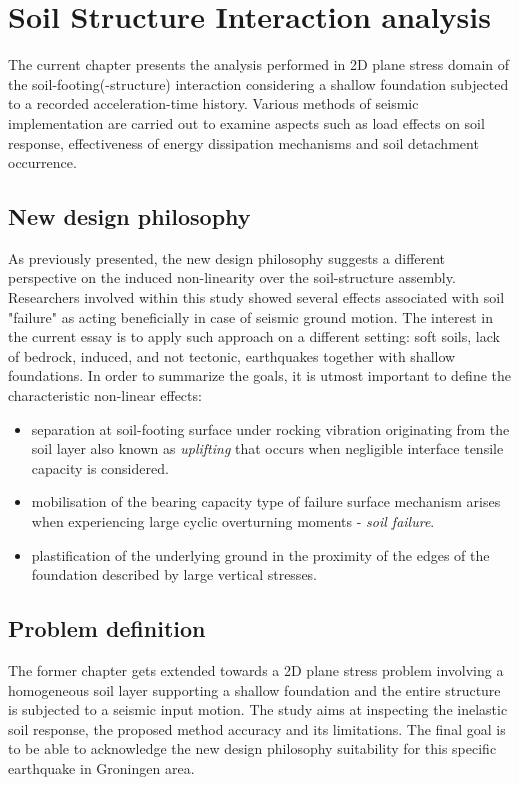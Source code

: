 	\chapter{Soil Structure Interaction analysis} \label{ch6}
	
	The current chapter presents the analysis performed in 2D plane stress domain of the soil-footing(-structure) interaction considering a shallow foundation subjected to a recorded acceleration-time history. Various methods of seismic implementation are carried out to examine aspects such as load effects on soil response, effectiveness of energy dissipation mechanisms and soil detachment occurrence.
	
	\section{New design philosophy}
	As previously presented, the new design philosophy suggests a different perspective on the induced non-linearity over the soil-structure assembly. Researchers involved within this study showed \mbox{several} effects associated with soil "failure" as acting beneficially in case of seismic ground motion. The interest in the current essay is to apply such approach on a different setting: soft soils, lack of bedrock, induced, and not tectonic, earthquakes together with shallow foundations. In order to summarize the goals, it is utmost important to define the characteristic non-linear effects:
	\begin{itemize}
		\item separation at soil-footing surface under rocking vibration originating from the soil layer also known as \textit{uplifting} that occurs when negligible interface tensile capacity is considered.
		\item mobilisation of the bearing capacity type of failure surface mechanism arises when experiencing large cyclic overturning moments - \textit{soil failure}.
		\item plastification of the underlying ground in the proximity of the edges of the foundation \mbox{described} by large vertical stresses.
	\end{itemize} 
	
	\section{Problem definition}
	The former chapter gets extended towards a 2D plane stress problem involving a homogeneous soil layer supporting a shallow foundation and the entire structure is subjected to a seismic input motion. The study aims at inspecting the inelastic soil response, the proposed method accuracy and its limitations. The final goal is to be able to acknowledge the new design philosophy suitability for this specific earthquake in Groningen area.
	
